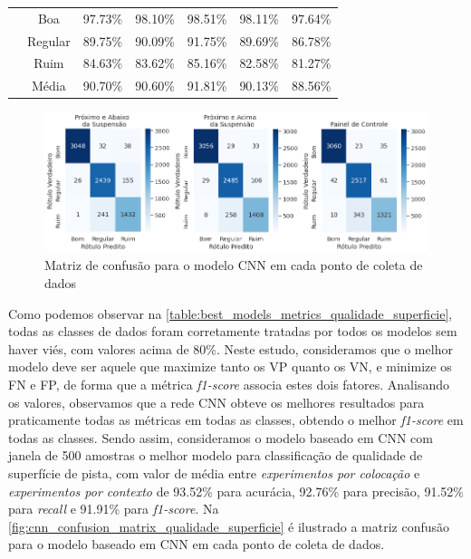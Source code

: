 \begin{table}[H]
\begin{tabular}{ccccccc}
  & Boa     & 97.73\% & 98.10\% & \cellcolor[HTML]{34FF34}98.51\% & 98.11\% & 97.64\% \\ \cmidrule{2-7} 
 & Regular  & 89.75\% & 90.09\% & \cellcolor[HTML]{34FF34}91.75\% & 89.69\% & 86.78\% \\ \cmidrule{2-7} 
 & Ruim     & 84.63\% & 83.62\% & \cellcolor[HTML]{34FF34}85.16\% & 82.58\% & 81.27\% \\ \cmidrule{2-7} 
 & Média    & 90.70\% & 90.60\% & \cellcolor[HTML]{34FF34}91.81\% & 90.13\% & 88.56\% \\ \bottomrule
\end{tabular}
\end{table}

\begin{figure}[H]
  \centering
  \caption{Matriz de confusão para o modelo CNN em cada ponto de coleta de dados}
  \label{fig:cnn_confusion_matrix_qualidade_superficie}
  \includegraphics[width=1\textwidth]{figuras/fig_51.png}
\end{figure}

Como podemos observar na \autoref{table:best_models_metrics_qualidade_superficie}, todas as classes de dados foram corretamente tratadas por todos os modelos sem haver viés, com valores acima de 80\%. Neste estudo, consideramos que o melhor modelo deve ser aquele que maximize tanto os VP quanto os VN, e minimize os FN e FP, de forma que a métrica \textit{f1-score} associa estes dois fatores. Analisando os valores, observamos que a rede CNN obteve os melhores resultados para praticamente todas as métricas em todas as classes, obtendo o melhor \textit{f1-score} em todas as classes. Sendo assim, consideramos o modelo baseado em CNN com janela de 500 amostras o melhor modelo para classificação de qualidade de superfície de pista, com valor de média entre \emph{experimentos por colocação} e \emph{experimentos por contexto} de 93.52\% para acurácia, 92.76\% para precisão, 91.52\% para \textit{recall} e 91.91\% para \textit{f1-score}. Na \autoref{fig:cnn_confusion_matrix_qualidade_superficie} é ilustrado a matriz confusão para o modelo baseado em CNN em cada ponto de coleta de dados.

